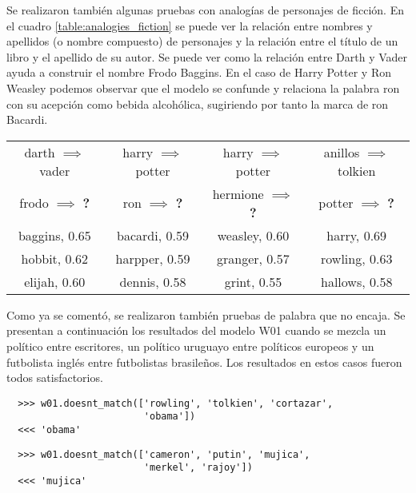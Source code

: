 Se realizaron también algunas pruebas con analogías de personajes de ficción. En el cuadro
\ref{table:analogies_fiction} se puede ver la relación entre nombres y apellidos
(o nombre compuesto) de personajes y la relación entre el título de un libro y el apellido de su
autor. Se puede ver como la relación entre Darth y Vader ayuda a construir el nombre Frodo
Baggins. En el caso de Harry Potter y Ron Weasley podemos observar que el modelo se
confunde y relaciona la palabra ron con su acepción como bebida alcohólica, sugiriendo por
tanto la marca de ron Bacardi.

\begin{table*}[ht]
    \centering
    \begin{tabular}{|c|c|c|c|}
        \hline
        darth $\implies$ vader & harry $\implies$ potter & harry $\implies$ potter & anillos $\implies$ tolkien\\
        frodo $\implies$ \textbf{?} & ron $\implies$ \textbf{?} & hermione $\implies$ \textbf{?} & potter $\implies$ \textbf{?}\\
        \hline
        baggins, 0.65 & bacardi, 0.59 & weasley, 0.60 & harry, 0.69\\
        hobbit, 0.62 & harpper, 0.59 & granger, 0.57 & rowling, 0.63\\
        elijah, 0.60 & dennis, 0.58 & grint, 0.55 & hallows, 0.58\\
        \hline
    \end{tabular}
    \caption{Analogías relacionadas a personajes y autores de ficción.}
    \label{table:analogies_fiction}
\end{table*}

Como ya se comentó, se realizaron también pruebas de palabra que no encaja. Se presentan
a continuación los resultados del modelo W01 cuando se mezcla un político entre escritores, un
político uruguayo entre políticos europeos y un futbolista inglés entre futbolistas brasileños. Los
resultados en estos casos fueron todos satisfactorios.

\begin{lstlisting}
  >>> w01.doesnt_match(['rowling', 'tolkien', 'cortazar',
                        'obama'])
  <<< 'obama'
\end{lstlisting}

\begin{lstlisting}
  >>> w01.doesnt_match(['cameron', 'putin', 'mujica',
                        'merkel', 'rajoy'])
  <<< 'mujica'
\end{lstlisting}

